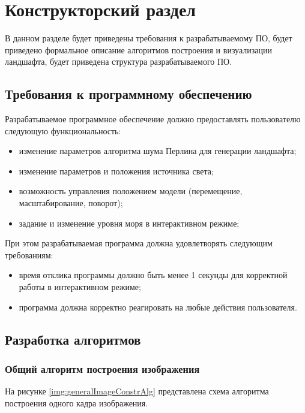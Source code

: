 \chapter{Конструкторский раздел}


В данном разделе будет приведены требования к разрабатываемому ПО, будет приведено формальное описание алгоритмов построения и визуализации ландшафта, будет приведена структура разрабатываемого ПО.

\section{Требования к программному обеспечению}

Разрабатываемое программное обеспечение должно предоставлять пользователю следующую функциональность:

\begin{itemize}[label=--]
	\item изменение параметров алгоритма шума Перлина для генерации ландшафта;
	\item изменение параметров и положения источника света;
	\item возможность управления положением модели (перемещение, масштабирование, поворот);
	\item задание и изменение уровня моря в интерактивном режиме;
\end{itemize}

При этом разрабатываемая программа должна удовлетворять следующим требованиям:

\begin{itemize}[label=--]
	\item время отклика программы должно быть менее 1 секунды для корректной работы в интерактивном режиме;
	\item программа должна корректно реагировать на любые действия пользователя.
\end{itemize}

\section{Разработка алгоритмов}

\subsection{Общий алгоритм построения изображения}

На рисунке \ref{img:generalImageConstrAlg} представлена схема алгоритма построения одного кадра изображения.

